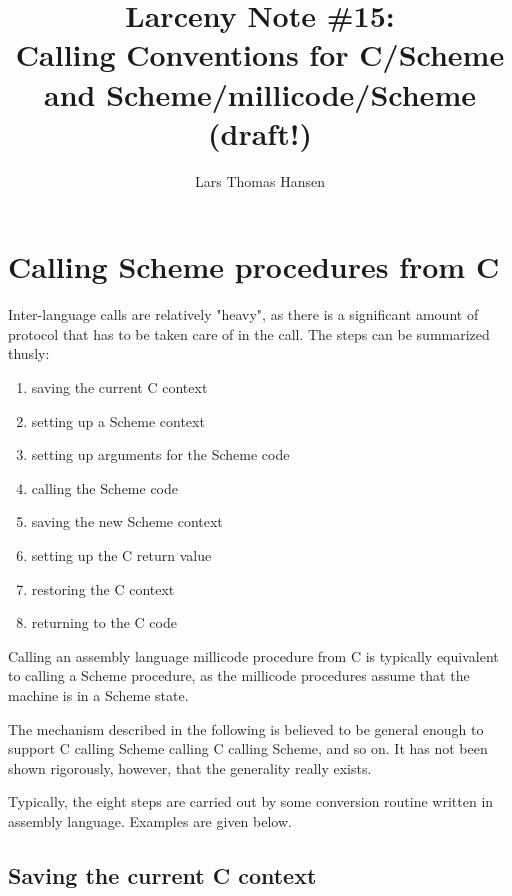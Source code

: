 


\title{Larceny Note \#15: \\
       Calling Conventions for C/Scheme and Scheme/millicode/Scheme \\
       {\tenrm (draft!)}}
\author{Lars Thomas Hansen}


\maketitle

\section{Calling Scheme procedures from C}

Inter-language calls are relatively "heavy", as there is a significant
amount of protocol that has to be taken care of in the call. The steps can
be summarized thusly:

\begin{enumerate}
\item saving the current C context
\item setting up a Scheme context
\item setting up arguments for the Scheme code
\item calling the Scheme code
\item saving the new Scheme context
\item setting up the C return value
\item restoring the C context
\item returning to the C code
\end{enumerate}

Calling an assembly language millicode procedure from C is typically
equivalent to calling a Scheme procedure, as the millicode procedures
assume that the machine is in a Scheme state.

The mechanism described in the following is believed to be general enough
to support C calling Scheme calling C calling Scheme, and so on. It has
not been shown rigorously, however, that the generality really exists.

Typically, the eight steps are carried out by some conversion routine
written in assembly language. Examples are given below.

\subsection{Saving the current C context}

